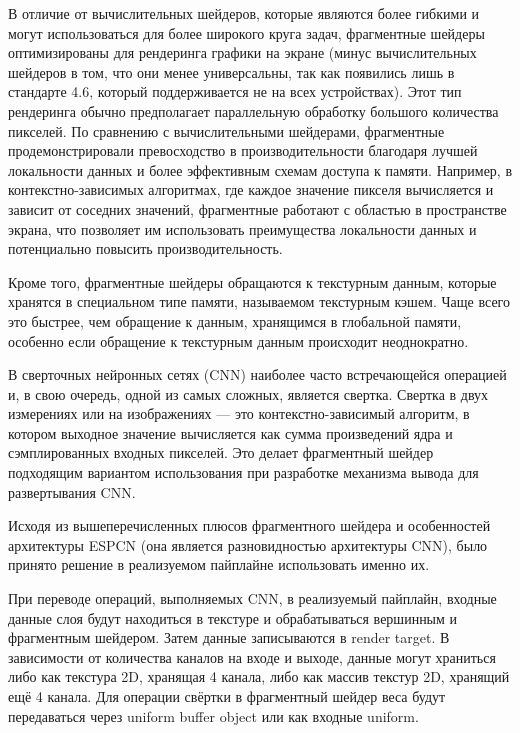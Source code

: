 \documentclass[a4paper,14pt]{extreport}
\begin{document}
            В отличие от вычислительных шейдеров, которые являются более гибкими и могут использоваться для более широкого круга задач, фрагментные шейдеры оптимизированы для рендеринга графики на экране (минус вычислительных шейдеров в том, что они менее универсальны, так как появились лишь в стандарте 4.6, который поддерживается не на всех устройствах). Этот тип рендеринга обычно предполагает параллельную обработку большого количества пикселей. По сравнению с вычислительными шейдерами, фрагментные продемонстрировали превосходство в производительности благодаря лучшей локальности данных и более эффективным схемам доступа к памяти. Например, в контекстно-зависимых алгоритмах, где каждое значение пикселя вычисляется и зависит от соседних значений, фрагментные работают с областью в пространстве экрана, что позволяет им использовать преимущества локальности данных и потенциально повысить производительность.
            
            Кроме того, фрагментные шейдеры обращаются к текстурным данным, которые хранятся в специальном типе памяти, называемом текстурным кэшем. Чаще всего это быстрее, чем обращение к данным, хранящимся в глобальной памяти, особенно если обращение к текстурным данным происходит неоднократно.
            
            В сверточных нейронных сетях (CNN) наиболее часто встречающейся операцией и, в свою очередь, одной из самых сложных, является свертка. Свертка в двух измерениях или на изображениях — это контекстно-зависимый алгоритм, в котором выходное значение вычисляется как сумма произведений ядра и сэмплированных входных пикселей. Это делает фрагментный шейдер подходящим вариантом использования при разработке механизма вывода для развертывания CNN.

            Исходя из вышеперечисленных плюсов фрагментного шейдера и особенностей архитектуры ESPCN (она является разновидностью архитектуры CNN), было принято решение в реализуемом пайплайне использовать именно их.

            При переводе операций, выполняемых CNN, в реализуемый пайплайн, входные данные слоя будут находиться в текстуре и обрабатываться вершинным и фрагментным шейдером. Затем данные записываются в render target. В зависимости от количества каналов на входе и выходе, данные могут храниться либо как текстура 2D, хранящая 4 канала, либо как массив текстур 2D, хранящий ещё 4 канала. Для операции свёртки в фрагментный шейдер веса будут передаваться через uniform buffer object или как входные uniform.
            
\end{document}
